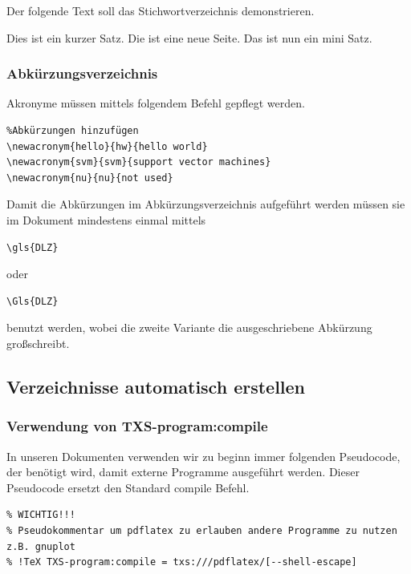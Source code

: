 Der folgende Text soll das Stichwortverzeichnis demonstrieren.

Dies ist ein kurzer  Satz.
Die ist eine neue  Seite.
Das ist nun ein mini  Satz.

\subsubsection{Abkürzungsverzeichnis}

Akronyme müssen mittels folgendem Befehl gepflegt werden.

\begin{lstlisting}
%Abkürzungen hinzufügen
\newacronym{hello}{hw}{hello world}
\newacronym{svm}{svm}{support vector machines}
\newacronym{nu}{nu}{not used} 
\end{lstlisting}

Damit die Abkürzungen im Abkürzungsverzeichnis aufgeführt werden müssen sie im Dokument mindestens einmal mittels

\begin{lstlisting}
\gls{DLZ} 
\end{lstlisting}
oder
\begin{lstlisting}
\Gls{DLZ}
\end{lstlisting}

benutzt werden, wobei die zweite Variante die ausgeschriebene Abkürzung großschreibt. 

\subsection{Verzeichnisse automatisch erstellen}

\subsubsection{Verwendung von TXS-program:compile}

In unseren Dokumenten verwenden wir zu beginn immer folgenden Pseudocode, der benötigt wird, damit externe Programme ausgeführt werden. Dieser Pseudocode ersetzt den Standard compile Befehl.
\begin{lstlisting}
% WICHTIG!!!  
% Pseudokommentar um pdflatex zu erlauben andere Programme zu nutzen z.B. gnuplot
% !TeX TXS-program:compile = txs:///pdflatex/[--shell-escape] 
\end{lstlisting}

